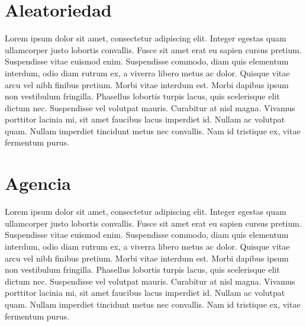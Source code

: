 \section{Aleatoriedad}

Lorem ipsum dolor sit amet, consectetur adipiscing elit. Integer egestas quam ullamcorper justo lobortis convallis. Fusce sit amet erat eu sapien cursus pretium. Suspendisse vitae euismod enim. Suspendisse commodo, diam quis elementum interdum, odio diam rutrum ex, a viverra libero metus ac dolor. Quisque vitae arcu vel nibh finibus pretium. Morbi vitae interdum est. Morbi dapibus ipsum non vestibulum fringilla. Phasellus lobortis turpis lacus, quis scelerisque elit dictum nec. Suspendisse vel volutpat mauris. Curabitur at nisl magna. Vivamus porttitor lacinia mi, sit amet faucibus lacus imperdiet id. Nullam ac volutpat quam. Nullam imperdiet tincidunt metus nec convallis. Nam id tristique ex, vitae fermentum purus.

\section{Agencia}

Lorem ipsum dolor sit amet, consectetur adipiscing elit. Integer egestas quam ullamcorper justo lobortis convallis. Fusce sit amet erat eu sapien cursus pretium. Suspendisse vitae euismod enim. Suspendisse commodo, diam quis elementum interdum, odio diam rutrum ex, a viverra libero metus ac dolor. Quisque vitae arcu vel nibh finibus pretium. Morbi vitae interdum est. Morbi dapibus ipsum non vestibulum fringilla. Phasellus lobortis turpis lacus, quis scelerisque elit dictum nec. Suspendisse vel volutpat mauris. Curabitur at nisl magna. Vivamus porttitor lacinia mi, sit amet faucibus lacus imperdiet id. Nullam ac volutpat quam. Nullam imperdiet tincidunt metus nec convallis. Nam id tristique ex, vitae fermentum purus.
